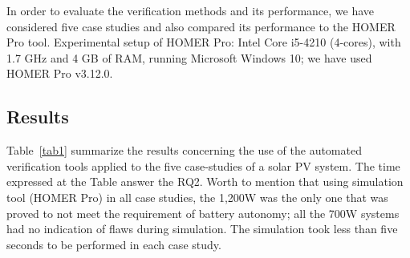\documentclass[runningheads]{llncs}
\begin{document}
In order to evaluate the verification methods and its performance, we have considered five case studies and also compared its performance to the HOMER Pro tool. %
Experimental setup of HOMER Pro: Intel Core i5-4210 (4-cores), with 1.7 GHz and 4 GB of RAM, running Microsoft Windows 10; we have used HOMER Pro v3.12.0. 

\subsection{Results}
\label{sec:results_indeed}
%
Table~\ref{tab1} summarize the results concerning the use of the automated verification tools applied to the five case-studies of a solar PV system. The time expressed at the Table answer the RQ2. Worth to mention that using simulation tool (HOMER Pro) in all case studies, the 1,200W was the only one that was proved to not meet the requirement of battery autonomy; all the 700W systems had no indication of flaws during simulation. The simulation took less than five seconds to be performed in each case study.
\end{document}
